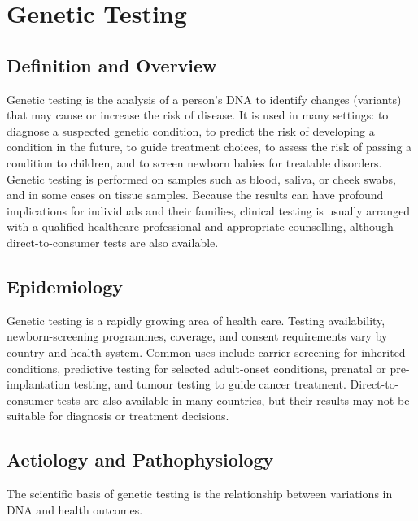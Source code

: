 \chapter{Genetic Testing}

\section*{Definition and Overview}
Genetic testing is the analysis of a person's DNA to identify changes (variants) that may cause or increase the risk of disease. It is used in many settings: to diagnose a suspected genetic condition, to predict the risk of developing a condition in the future, to guide treatment choices, to assess the risk of passing a condition to children, and to screen newborn babies for treatable disorders. Genetic testing is performed on samples such as blood, saliva, or cheek swabs, and in some cases on tissue samples. Because the results can have profound implications for individuals and their families, clinical testing is usually arranged with a qualified healthcare professional and appropriate counselling, although direct-to-consumer tests are also available.

\section*{Epidemiology}
Genetic testing is a rapidly growing area of health care. Testing availability, newborn-screening programmes, coverage, and consent requirements vary by country and health system. Common uses include carrier screening for inherited conditions, predictive testing for selected adult-onset conditions, prenatal or pre-implantation testing, and tumour testing to guide cancer treatment. Direct-to-consumer tests are also available in many countries, but their results may not be suitable for diagnosis or treatment decisions.

\section*{Aetiology and Pathophysiology}
The scientific basis of genetic testing is the relationship between variations in DNA and health outcomes.

